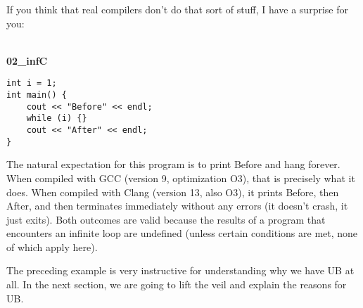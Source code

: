 If you think that real compilers don't do that sort of stuff, I have a surprise for you:

\hspace*{\fill} \\ %
\noindent
\textbf{02\_infC}
\begin{lstlisting}[style=styleCXX]
int i = 1;
int main() {
	cout << "Before" << endl;
	while (i) {}
	cout << "After" << endl;
}
\end{lstlisting}

The natural expectation for this program is to print Before and hang forever. When compiled with GCC (version 9, optimization O3), that is precisely what it does. When compiled with Clang (version 13, also O3), it prints Before, then After, and then terminates immediately without any errors (it doesn't crash, it just exits). Both outcomes are valid because the results of a program that encounters an infinite loop are undefined (unless certain conditions are met, none of which apply here).

The preceding example is very instructive for understanding why we have UB at all. In the next section, we are going to lift the veil and explain the reasons for UB.

























